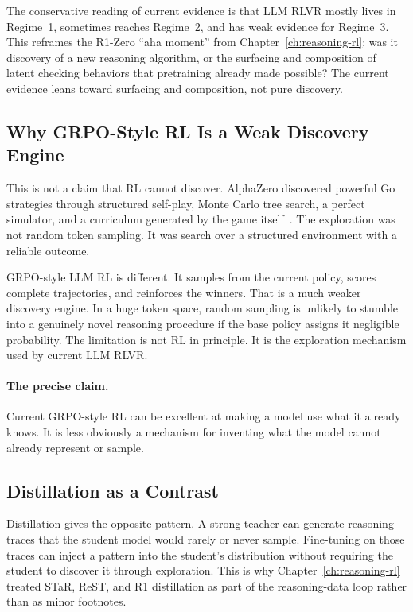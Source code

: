 The conservative reading of current evidence is that LLM RLVR mostly lives in Regime~1, sometimes reaches Regime~2, and has weak evidence for Regime~3. This reframes the R1-Zero ``aha moment'' from Chapter~\ref{ch:reasoning-rl}: was it discovery of a new reasoning algorithm, or the surfacing and composition of latent checking behaviors that pretraining already made possible? The current evidence leans toward surfacing and composition, not pure discovery.

\subsection{Why GRPO-Style RL Is a Weak Discovery Engine}

This is not a claim that RL cannot discover. AlphaZero discovered powerful Go strategies through structured self-play, Monte Carlo tree search, a perfect simulator, and a curriculum generated by the game itself~\cite{silver2018alphazero}. The exploration was not random token sampling. It was search over a structured environment with a reliable outcome.

GRPO-style LLM RL is different. It samples from the current policy, scores complete trajectories, and reinforces the winners. That is a much weaker discovery engine. In a huge token space, random sampling is unlikely to stumble into a genuinely novel reasoning procedure if the base policy assigns it negligible probability. The limitation is not RL in principle. It is the exploration mechanism used by current LLM RLVR.

\paragraph{The precise claim.} Current GRPO-style RL can be excellent at making a model use what it already knows. It is less obviously a mechanism for inventing what the model cannot already represent or sample.

\subsection{Distillation as a Contrast}

Distillation gives the opposite pattern. A strong teacher can generate reasoning traces that the student model would rarely or never sample. Fine-tuning on those traces can inject a pattern into the student's distribution without requiring the student to discover it through exploration. This is why Chapter~\ref{ch:reasoning-rl} treated STaR, ReST, and R1 distillation as part of the reasoning-data loop rather than as minor footnotes.

